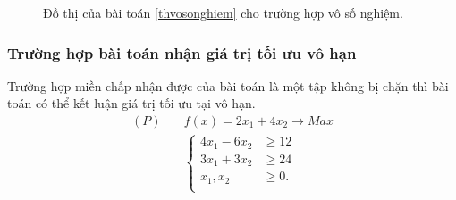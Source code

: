 \documentclass[12pt,a4paper]{report}
\begin{document}
\begin{figure}[!htb]
\begin{minipage}{0.48\textwidth}
    \caption{Đồ thị của bài toán \eqref{thvosonghiem} cho trường hợp vô số nghiệm.}
    \end{minipage}
\end{figure}

\subsubsection*{Trường hợp bài toán nhận giá trị tối ưu vô hạn}

Trường hợp miền chấp nhận được của bài toán là một tập không bị chặn thì bài toán có thể kết luận giá trị tối ưu tại vô hạn.
\begin{equation} \label{thvohannghiem}
	\begin{split}
	(P) \quad & f(x) = 2x_1 + 4x_2 \longrightarrow Max \\
		& \left\{\begin{split}
        4x_1 - 6x_2 &\geq 12 \\
        3 x_1 + 3x_2 &\geq 24 \\
		x_1, x_2 &\geq 0. \\
		\end{split}\right.    
	\end{split}
\end{equation}
\end{document}
